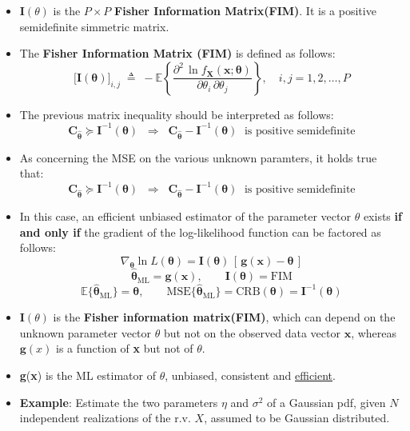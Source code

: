 \begin{itemize}
    
    \item \(\mathbf{I}(\theta)\) is the \(P\times P\) \textbf{Fisher Information Matrix(FIM)}. It is a positive semidefinite simmetric matrix.
    \item The \textbf{Fisher Information Matrix (FIM)} is defined as follows:
    $$
    \big[\mathbf{I}(\boldsymbol{\theta})\big]_{i,j}\;\triangleq\;-\mathbb{E}\!\left\{\frac{\partial^{2}\,\ln f_{\mathbf{X}}(\mathbf{x};\boldsymbol{\theta})}{\partial \theta_{i}\,\partial \theta_{j}}\right\},\quad i,j=1,2,\ldots,P
    $$
    \item The previous matrix inequality should be interpreted as follows:
    $$
\mathbf{C}_{\hat{\boldsymbol{\theta}}}\succeq \mathbf{I}^{-1}(\boldsymbol{\theta})
\;\;\Longrightarrow\;\;
\mathbf{C}_{\hat{\boldsymbol{\theta}}}-\mathbf{I}^{-1}(\boldsymbol{\theta})\;\text{ is positive semidefinite}
$$
    \item As concerning the MSE on the various unknown paramters, it holds true that:
    $$
    \mathbf{C}_{\hat{\boldsymbol{\theta}}}\succeq \mathbf{I}^{-1}(\boldsymbol{\theta})
    \;\;\Longrightarrow\;\;
    \mathbf{C}_{\hat{\boldsymbol{\theta}}}-\mathbf{I}^{-1}(\boldsymbol{\theta})\;\text{ is positive semidefinite}
    $$
    \item In this case, an efficient unbiased estimator of the parameter vector \(\theta\) exists \textbf{if and only if} the gradient of the log-likelihood function can be factored as follows:
    $$
\nabla_{\boldsymbol{\theta}}\ln L(\boldsymbol{\theta})
=\mathbf{I}(\boldsymbol{\theta})\,[\,\mathbf{g}(\mathbf{x})-\boldsymbol{\theta}\,]
$$ 
$$
\hat{\boldsymbol{\theta}}_{\mathrm{ML}}=\mathbf{g}(\mathbf{x}),\qquad
\mathbf{I}(\boldsymbol{\theta})=\text{FIM}
$$ 
$$
\mathbb{E}\{\hat{\boldsymbol{\theta}}_{\mathrm{ML}}\}=\boldsymbol{\theta},\qquad
\mathrm{MSE}\{\hat{\boldsymbol{\theta}}_{\mathrm{ML}}\}
=\mathrm{CRB}(\boldsymbol{\theta})
=\mathbf{I}^{-1}(\boldsymbol{\theta})
$$
    \item \(\mathbf{I}(\theta)\) is the \textbf{Fisher information matrix(FIM)}, which can depend on the unknown parameter vector \(\theta\) but not on the observed data vector \(\textbf{x}\), whereas \(\mathbf{g}(x)\) is a function of \textbf{x} but not of \(\theta\).
    \item \textbf{g}(\textbf{x}) is the ML estimator of \(\theta\), unbiased, consistent and \underline{efficient}.
    \item \textbf{Example}: Estimate the two parameters \(\eta\) and \(\sigma^2\) of a Gaussian pdf, given \(N\) independent realizations of the r.v. \(X\), assumed to be Gaussian distributed.

\end{itemize}
